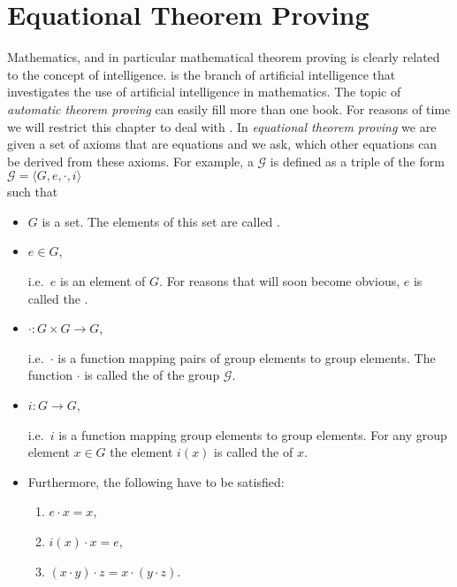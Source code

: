 \chapter{Equational Theorem Proving}
Mathematics, and in particular mathematical theorem proving is clearly related to the concept of intelligence.
 is the branch of artificial intelligence that investigates the use of
artificial intelligence in mathematics.  The topic of \emph{automatic theorem proving} can easily fill more
than one book.  For reasons of time we will restrict this chapter to deal with .  In
\emph{equational theorem proving}  we are given a set of axioms that are
equations and we ask, which other equations can be derived from these axioms.  For example, a 
$\mathcal{G}$  is defined as a triple of the form
\\[0.2cm]
\hspace*{1.3cm}
$\mathcal{G} = \langle G, e, \cdot, i \rangle$
\\[0.2cm]
such that
\begin{itemize}
\item $G$ is a set.  The elements of this set are called . 
\item $e \in G$,

      i.e.~$e$ is an element of $G$.  For reasons that will soon become obvious, $e$ is called the
      . 
\item $\cdot: G \times G \rightarrow G$,

      i.e.~$\cdot$ is a function mapping pairs of group elements to group elements.  The function $\cdot$ is
      called the  of the group $\mathcal{G}$. 
\item $i: G \rightarrow G$,

      i.e.~$i$ is a function mapping group elements to group elements.  For any group element $x \in G$ the
      element $i(x)$ is called the   of $x$. 
\item Furthermore, the following   have to be satisfied:
      \begin{enumerate}
      \item $e \cdot x = x$, 
      \item $i(x) \cdot x = e$, 
      \item $(x \cdot y) \cdot z = x \cdot (y \cdot z)$.
      \end{enumerate}
\end{itemize}
